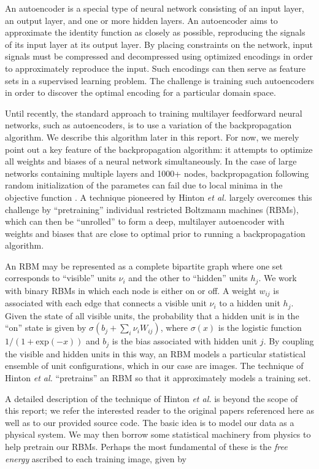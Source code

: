 \documentclass{article}
\begin{document}
An autoencoder is a special type of neural network consisting of an input layer,
an output layer, and one or more hidden layers. An autoencoder aims to
approximate the identity function as closely as possible, reproducing the
signals of its input layer at its output layer. By placing constraints on the
network, input signals must be compressed and decompressed using optimized
encodings in order to approximately reproduce the input. Such encodings can then
serve as feature sets in a supervised learning problem. The challenge is
training such autoencoders in order to discover the optimal encoding for a
particular domain space.

Until recently, the standard approach to training multilayer feedforward neural
networks, such as autoencoders, is to use a variation of the backpropagation
algorithm. We describe this algorithm later in this report. For now, we merely
point out a key feature of the backpropagation algorithm: it attempts to
optimize all weights and biases of a neural network simultaneously. In the case
of large networks containing multiple layers and 1000+ nodes, backpropagation
following random initialization of the parametes can fail due to local minima in
the objective function \cite{art:KL}. A technique pioneered by Hinton {\em et al.}
\cite{art:HS} largely overcomes this challenge by ``pretraining'' individual
restricted Boltzmann machines (RBMs), which can then be ``unrolled'' to form a
deep, multilayer autoencoder with weights and biases that are close to optimal
prior to running a backpropagation algorithm.

An RBM may be represented as a complete bipartite graph where one set
corresponds to ``visible'' units $\nu_i$ and the other to ``hidden'' units
$h_j$. We work with binary RBMs in which each node is either on or off. A weight
$w_{ij}$ is associated with each edge that connects a visible unit $\nu_i$ to a
hidden unit $h_j$. Given the state of all visible units, the probability that a
hidden unit is in the ``on'' state is given by
$\sigma\left(b_j + \sum_i{\nu_iW_{ij}}\right)$, where $\sigma (x)$ is the logistic function
$1/(1 + \mathrm{exp}(-x))$ and $b_j$ is the bias associated with hidden unit $j$. By
coupling the visible and hidden units in this way, an RBM models a particular
statistical ensemble of unit configurations, which in our case are images. The
technique of Hinton {\em et al.} ``pretrains'' an RBM so that it approximately
models a training set.

A detailed description of the technique of Hinton {\em et al.} is beyond the
scope of this report; we refer the interested reader to the original papers
referenced here as well as to our provided source code. The basic idea is to
model our data as a physical system. We may then borrow some statistical
machinery from physics to help pretrain our RBMs. Perhaps the most fundamental
of these is the {\em free energy} ascribed to each training image, given by
\end{document}
